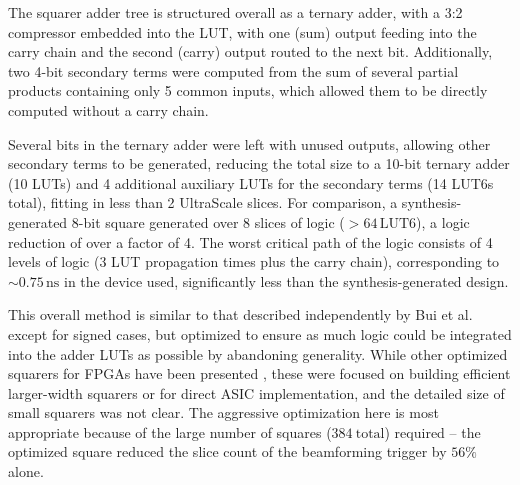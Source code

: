 \documentclass{IEEEtran}
\begin{document}
The squarer adder tree is structured overall as a ternary adder,
with a 3:2 compressor embedded into the LUT, with one (sum) output
feeding into the carry chain and the second (carry) output
routed to the next bit. Additionally, two 4-bit secondary terms
were computed from the sum of several partial products containing
only 5 common inputs, which allowed them to be directly computed
without a carry chain.

Several bits in the ternary adder were left with unused outputs,
allowing other secondary terms to be generated,
reducing the total size to a 10-bit ternary adder (10 LUTs) and
4 additional auxiliary LUTs for the secondary terms (14 LUT6s total), 
fitting in less than 2 UltraScale slices. For comparison, a
synthesis-generated 8-bit square generated over 8 slices of logic
($>64\,\mathrm{LUT6}$), a logic reduction of over a factor of 4.
The worst critical path of the logic consists of 4 levels of logic
(3 LUT propagation times plus the carry chain), corresponding to
$\sim0.75\,\text{ns}$ in the device used, significantly less than
the synthesis-generated design.

This overall method is similar to that described independently by Bui et al.
\cite{bui2014additional} except for signed cases, but optimized
to ensure as much logic could be integrated into the adder LUTs
as possible by abandoning generality. While other optimized
squarers for FPGAs have been presented \cite{bottcher2022resource},
these were focused on building efficient larger-width squarers 
or for direct ASIC implementation, and the detailed size of small 
squarers was not clear. The aggressive optimization here is most
appropriate because of the large number of squares ($384~\mathrm{total}$) 
required -- the optimized square reduced the slice count of the
beamforming trigger by $56\%$ alone.
\end{document}
